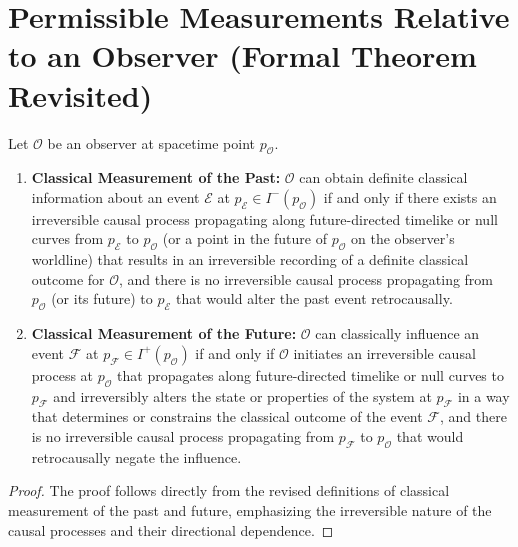 	\section{Permissible Measurements Relative to an Observer (Formal Theorem Revisited)}
	
	\begin{theorem}
		Let $\mathcal{O}$ be an observer at spacetime point $p_{\mathcal{O}}$.
		
		\begin{enumerate}
			\item \textbf{Classical Measurement of the Past:} $\mathcal{O}$ can obtain definite classical information about an event $\mathcal{E}$ at $p_{\mathcal{E}} \in I^-(p_{\mathcal{O}})$ if and only if there exists an irreversible causal process propagating along future-directed timelike or null curves from $p_{\mathcal{E}}$ to $p_{\mathcal{O}}$ (or a point in the future of $p_{\mathcal{O}}$ on the observer's worldline) that results in an irreversible recording of a definite classical outcome for $\mathcal{O}$, and there is no irreversible causal process propagating from $p_{\mathcal{O}}$ (or its future) to $p_{\mathcal{E}}$ that would alter the past event retrocausally.
			
			\item \textbf{Classical Measurement of the Future:} $\mathcal{O}$ can classically influence an event $\mathcal{F}$ at $p_{\mathcal{F}} \in I^+(p_{\mathcal{O}})$ if and only if $\mathcal{O}$ initiates an irreversible causal process at $p_{\mathcal{O}}$ that propagates along future-directed timelike or null curves to $p_{\mathcal{F}}$ and irreversibly alters the state or properties of the system at $p_{\mathcal{F}}$ in a way that determines or constrains the classical outcome of the event $\mathcal{F}$, and there is no irreversible causal process propagating from $p_{\mathcal{F}}$ to $p_{\mathcal{O}}$ that would retrocausally negate the influence.
		\end{enumerate}
		\begin{proof}
			The proof follows directly from the revised definitions of classical measurement of the past and future, emphasizing the irreversible nature of the causal processes and their directional dependence.
		\end{proof}
	\end{theorem}
	

